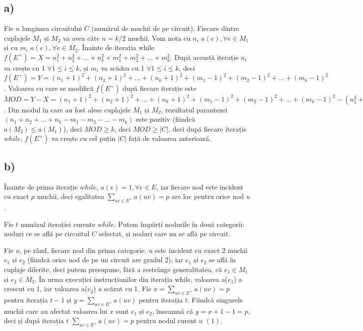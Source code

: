 \documentclass[a4paper,12pt]{article}
\begin{document}
\subsection{a)}

Fie $n$ lungimea circuitului $C$ (numărul de muchii de pe circuit). Fiecare dintre cuplajele $M_{1}$ și $M_{2}$ va avea câte $n = k/2$ muchii. Vom nota cu $n_i$ $a(e), \forall e \in M_{1}$ și cu $m_i$ $a(e), \forall e \in M_{2}$. Înainte de iterația while $f(E^{+}) = X = n_1^2 + n_2^2 + ... + n_k^2 + m_1^2 + m_2^2 + ... + m_k^2$. După această iterație $n_i$ va crește cu 1 $\forall 1 \leq i \leq k$, și $m_i$ va scădea cu 1 $\forall 1 \leq i \leq k$, deci $ f(E^{+}) = Y = (n_1+1)^2 + (n_2+1)^2 + ... + (n_k+1)^2 + (m_1-1)^2 + (m_2-1)^2 + ... + (m_k-1)^2 $. Valoarea cu care se modifică $f(E^{+})$ după fiecare iterație este $MOD = Y - X = (n_1+1)^2 + (n_2+1)^2 + ... + (n_k+1)^2 + (m_1-1)^2 + (m_2-1)^2 + ... + (m_k-1)^2 - (n_1^2 + n_2^2 + ... + n_k^2 + m_1^2 + m_2^2 + ... + m_k^2) = (n_1^2 + 2 \cdot n_1 + 1) + (n_2^2 + 2 \cdot n_2 + 1) + ... + (n_k^2 + 2 \cdot n_k + 1) + (m_1^2 - 2 \cdot m_1 + 1) + (m_2^2 - 2 \cdot m_2 + 1) + ... + (m_k^2 - 2 \cdot m_k + 1) - (n_1^2 + n_2^2 + ... + n_k^2 + m_1^2 + m_2^2 + ... + m_k^2) = 2 \cdot (n_1 + n_2 + ... + n_k - m_1 - m_2 - ... - m_k) + (1 + 1 + ... + 1) = 2 \cdot (n_1 + n_2 + ... + n_k - m_1 - m_2 - ... - m_k) + k$. Din modul în care au fost alese cuplajele $M_1$ și $M_2$, rezultatul parantezei $(n_1 + n_2 + ... + n_k - m_1 - m_2 - ... - m_k)$ este pozitiv (fiindcă $a(M_2) \leq a(M_1)$), deci $MOD \geq k$, deci $MOD \geq |C|$, deci după fiecare iterație $while$, $f(E^{+})$ va crește cu cel puțin $|C|$ față de valoarea anterioară.

\subsection{b)}

Înainte de prima iterație $while$, $a(e)=1, \forall e \in E$, iar fiecare nod este incident cu exact $p$ muchii, deci egalitatea $ \sum_{uv \in E^{+}} a(uv) = p $ are loc pentru orice nod $u$.

Fie $t$ numărul iterației curente $while$. Putem împărți nodurile în două categorii: noduri ce se află pe circuitul $C$ selectat, și noduri care nu se află pe circuit.

Fie $u$, pe rând, fiecare nod din prima categorie. $u$ este incident cu exact 2 muchii $e_{1}$ și $e_{2}$ (fiindcă orice nod de pe un circuit are gradul 2), iar $e_{1}$ și $e_{2}$ se află în cuplaje diferite, deci putem presupune, fără a restrânge generalitatea, că $e_{1} \in M_{1}$ și $e_{2} \in M_{2}$. În urma execuției instrucțiunilor din iterația while, valoarea a($e_{1}$) a crescut cu 1, iar valoarea a($e_{2}$) a scăzut cu 1. Fie $x = \sum_{uv \in E^{+}} a(uv) = p$ pentru iterația $t-1$ și $y = \sum_{uv \in E^{+}} a(uv) $ pentru iterația $t$. Fiindcă singurele muchii care au afectat valoarea lui $x$ sunt $e_{1}$ și $e_{2}$, înseamnă că $y = x + 1 - 1 = p$, deci și după iterația $t$ $ \sum_{uv \in E^{+}} a(uv) = p $ pentru nodul curent $u$ $(1)$.
\end{document}
